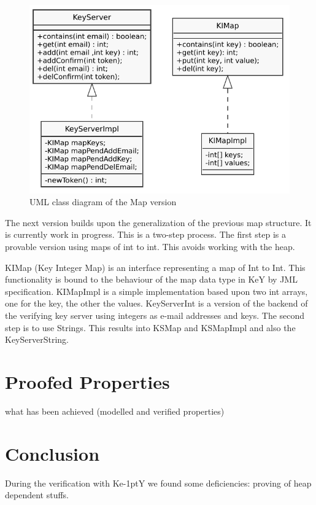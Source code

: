 \documentclass{llncs}
\newcommand{\KeY}{Ke\kern-1ptY\xspace}
\begin{document}
\begin{figure}
  \centering
  \includegraphics[width=.5\textwidth]{uml}
  \caption{UML class diagram of the Map version}
  \label{fig:umlclassdiagram}
\end{figure}
%
The next version builds upon the generalization of the previous map structure.
It is currently work in progress. This is a two-step process. The first step is
a provable version using maps of int to int. This avoids working with the heap.

KIMap (Key Integer Map) is an interface representing a map of Int to Int. This
functionality is bound to the behaviour of the map data type in KeY by JML
specification. KIMapImpl is a simple implementation based upon two int arrays,
one for the key, the other the values. KeyServerInt is a version of the backend
of the verifying key server using integers as e-mail addresses and keys. The
second step is to use Strings. This results into KSMap and KSMapImpl and also
the KeyServerString.
%

\section{Proofed Properties}

what has been achieved (modelled and verified properties)


\section{Conclusion }


During the verification with \KeY we found some deficiencies: proving of heap
dependent stuffs.
\end{document}
